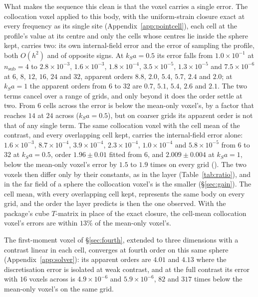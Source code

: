 \documentclass[11pt,a4paper]{article}
\begin{document}
What makes the sequence this clean is that the voxel carries a single error. The collocation voxel
applied to this body, with the uniform-strain closure exact at every frequency as its single site
(Appendix~\ref{app:pointcell}), each cell at the profile's value at its centre and only the cells whose
centres lie inside the sphere kept, carries two: its own internal-field error and the error of sampling the
profile, both $O(h^2)$ and of opposite signs. At $k_Sa=0.5$ its error falls from $1.0\times10^{-1}$ at
$n_{\mathrm{sub}}=4$ to $2.8\times10^{-3}$, $1.6\times10^{-3}$, $1.8\times10^{-4}$, $3.5\times10^{-5}$,
$1.3\times10^{-5}$ and $7.5\times10^{-6}$ at $6$, $8$, $12$, $16$, $24$ and $32$, apparent orders $8.8$,
$2.0$, $5.4$, $5.7$, $2.4$ and $2.0$; at $k_Sa=1$ the apparent orders from $6$ to $32$ are $0.7$, $5.1$,
$5.4$, $2.6$ and $2.1$. The two terms cancel over a range of grids, and only beyond it does the order
settle at two. From $6$ cells across the error is below the mean-only voxel's, by a factor that reaches
$14$ at $24$ across ($k_Sa=0.5$), but on coarser grids its apparent order is not that of any single term.
The same collocation voxel with the cell mean of the contrast, and every overlapping cell kept, carries
the internal-field error alone: $1.6\times10^{-3}$, $8.7\times10^{-4}$, $3.9\times10^{-4}$,
$2.3\times10^{-4}$, $1.0\times10^{-4}$ and $5.8\times10^{-5}$ from $6$ to $32$ at $k_Sa=0.5$, order
$1.96\pm0.01$ fitted from $6$, and $2.009\pm0.004$ at $k_Sa=1$, below the mean-only voxel's error by $1.5$
to $1.9$ times on every grid (). The two voxels then differ
only by their constants, as in the layer (Table~\ref{tab:ratio}), and in the far field of a sphere the
collocation voxel's is the smaller (\S\ref{sec:gain}). The cell mean, with every overlapping cell kept,
represents the same body on every grid, and the order the layer predicts is then the one observed. With
the package's cube $T$-matrix in place of the exact closure, the cell-mean collocation voxel's errors are
within $13\%$ of the mean-only voxel's.

The first-moment voxel of \S\ref{sec:fourth}, extended to three dimensions with a contrast linear in
each cell, converges at fourth order on this same sphere (Appendix~\ref{app:solver}): its apparent orders
are $4.01$ and $4.13$ where the discretisation error is isolated at weak contrast, and at the full
contrast its error with $16$ voxels across is $4.9\times10^{-6}$ and $5.9\times10^{-6}$, $82$ and
$317$ times below the mean-only voxel's on the same grid.
\end{document}
